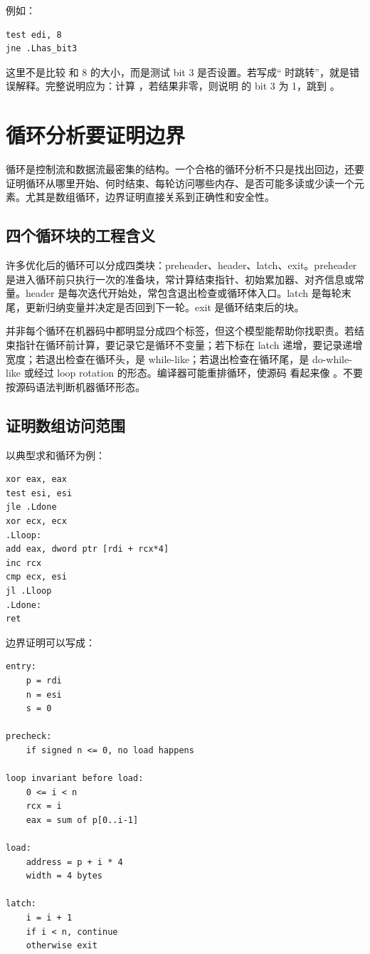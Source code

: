 例如：

\begin{lstlisting}
test edi, 8
jne .Lhas_bit3
\end{lstlisting}

这里不是比较  和 8 的大小，而是测试 bit 3 是否设置。若写成“ 时跳转”，就是错误解释。完整说明应为：计算 ，若结果非零，则说明  的 bit 3 为 1，跳到 。

\section{循环分析要证明边界}

循环是控制流和数据流最密集的结构。一个合格的循环分析不只是找出回边，还要证明循环从哪里开始、何时结束、每轮访问哪些内存、是否可能多读或少读一个元素。尤其是数组循环，边界证明直接关系到正确性和安全性。

\subsection{四个循环块的工程含义}

许多优化后的循环可以分成四类块：preheader、header、latch、exit。preheader 是进入循环前只执行一次的准备块，常计算结束指针、初始累加器、对齐信息或常量。header 是每次迭代开始处，常包含退出检查或循环体入口。latch 是每轮末尾，更新归纳变量并决定是否回到下一轮。exit 是循环结束后的块。

并非每个循环在机器码中都明显分成四个标签，但这个模型能帮助你找职责。若结束指针在循环前计算，要记录它是循环不变量；若下标在 latch 递增，要记录递增宽度；若退出检查在循环头，是 while-like；若退出检查在循环尾，是 do-while-like 或经过 loop rotation 的形态。编译器可能重排循环，使源码  看起来像 。不要按源码语法判断机器循环形态。

\subsection{证明数组访问范围}

以典型求和循环为例：

\begin{lstlisting}
xor eax, eax
test esi, esi
jle .Ldone
xor ecx, ecx
.Lloop:
add eax, dword ptr [rdi + rcx*4]
inc rcx
cmp ecx, esi
jl .Lloop
.Ldone:
ret
\end{lstlisting}

边界证明可以写成：

\begin{lstlisting}
entry:
    p = rdi
    n = esi
    s = 0

precheck:
    if signed n <= 0, no load happens

loop invariant before load:
    0 <= i < n
    rcx = i
    eax = sum of p[0..i-1]

load:
    address = p + i * 4
    width = 4 bytes

latch:
    i = i + 1
    if i < n, continue
    otherwise exit
\end{lstlisting}

